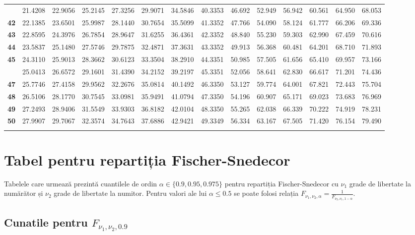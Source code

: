 \documentclass[]{article}
\begin{document}
\begin{longtable}{>{\bfseries}r|rrrrrrrrrrrrr}
\addlinespace
41 & 21.4208 & 22.9056 & 25.2145 & 27.3256 & 29.9071 & 34.5846 & 40.3353 & 46.692 & 52.949 & 56.942 & 60.561 & 64.950 & 68.053\\
42 & 22.1385 & 23.6501 & 25.9987 & 28.1440 & 30.7654 & 35.5099 & 41.3352 & 47.766 & 54.090 & 58.124 & 61.777 & 66.206 & 69.336\\
43 & 22.8595 & 24.3976 & 26.7854 & 28.9647 & 31.6255 & 36.4361 & 42.3352 & 48.840 & 55.230 & 59.303 & 62.990 & 67.459 & 70.616\\
44 & 23.5837 & 25.1480 & 27.5746 & 29.7875 & 32.4871 & 37.3631 & 43.3352 & 49.913 & 56.368 & 60.481 & 64.201 & 68.710 & 71.893\\
45 & 24.3110 & 25.9013 & 28.3662 & 30.6123 & 33.3504 & 38.2910 & 44.3351 & 50.985 & 57.505 & 61.656 & 65.410 & 69.957 & 73.166\\
\addlinespace
46 & 25.0413 & 26.6572 & 29.1601 & 31.4390 & 34.2152 & 39.2197 & 45.3351 & 52.056 & 58.641 & 62.830 & 66.617 & 71.201 & 74.436\\
47 & 25.7746 & 27.4158 & 29.9562 & 32.2676 & 35.0814 & 40.1492 & 46.3350 & 53.127 & 59.774 & 64.001 & 67.821 & 72.443 & 75.704\\
48 & 26.5106 & 28.1770 & 30.7545 & 33.0981 & 35.9491 & 41.0794 & 47.3350 & 54.196 & 60.907 & 65.171 & 69.023 & 73.683 & 76.969\\
49 & 27.2493 & 28.9406 & 31.5549 & 33.9303 & 36.8182 & 42.0104 & 48.3350 & 55.265 & 62.038 & 66.339 & 70.222 & 74.919 & 78.231\\
50 & 27.9907 & 29.7067 & 32.3574 & 34.7643 & 37.6886 & 42.9421 & 49.3349 & 56.334 & 63.167 & 67.505 & 71.420 & 76.154 & 79.490\\*
\end{longtable}

\endgroup{}

\section{Tabel pentru repartiția
Fischer-Snedecor}\label{tabel-pentru-repartitia-fischer-snedecor}

Tabelele care urmează prezintă cuantilele de ordin
\(\alpha\in\{0.9, 0.95, 0.975\}\) pentru repartiția Fischer-Snedecor cu
\(\nu_1\) grade de libertate la numărător și \(\nu_2\) grade de
libertate la numitor. Pentru valori ale lui \(\alpha \leq 0.5\) se poate
folosi relația
\(F_{\nu_1, \nu_2, \alpha} = \frac{1}{F_{\nu_2, \nu_1, 1-\alpha}}\).

\subsection{\texorpdfstring{Cunatile pentru
\(F_{\nu_1, \nu_2, 0.9}\)}{Cunatile pentru F_\{\nu_1, \nu_2, 0.9\}}}\label{cunatile-pentru-f_nu_1-nu_2-0.9}
\end{document}
